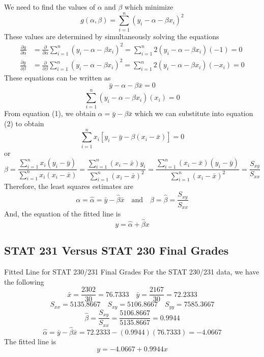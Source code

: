 We need to find the values of $ \alpha $ and $ \beta $ which minimize
\[g(\alpha, \beta)=\sum_{i=1}^{n}\left(y_{i}-\alpha-\beta x_{i}\right)^{2}\]
These values are determined by simultaneously solving the equations
\[
    \begin{aligned}
        \frac{\partial g}{\partial \alpha} & =\frac{\partial}{\partial \alpha} \sum_{i=1}^{n}\left(y_{i}-\alpha-\beta x_{i}\right)^{2}=\sum_{i=1}^{n} 2\left(y_{i}-\alpha-\beta x_{i}\right)(-1)=0               \\
        \frac{\partial g}{\partial \beta}  & =\frac{\partial}{\partial \beta} \sum_{i=1}^{n}\left(y_{i}-\alpha-\beta x_{i}\right)^{2}=\sum_{i=1}^{n} 2\left(y_{i}-\alpha-\beta x_{i}\right)\left(-x_{i}\right)=0
    \end{aligned}
\]
These equations can be written as
\begin{equation}\tag{1}
    \bar{y}-\alpha-\beta \bar{x}=0
\end{equation}
\begin{equation}\tag{2}
    \sum_{i=1}^{n}\left(y_{i}-\alpha-\beta x_{i}\right)\left(x_{i}\right)=0
\end{equation}
From equation (1), we obtain $ \alpha=\bar{y}-\beta \bar{x} $ which
we can substitute into equation (2) to obtain
\[\sum_{i=1}^{n} x_{i}\left[y_{i}-\bar{y}-\beta\left(x_{i}-\bar{x}\right)\right]=0\]
or
\[\beta=
    \frac{\sum\limits_{i=1}^{n} x_{i}\left(y_{i}-\bar{y}\right)}
    {\sum\limits_{i=1}^{n} x_{i}\left(x_{i}-\bar{x}\right)}
    =\frac{\sum\limits_{i=1}^{n}\left(x_{i}-\bar{x}\right) y_{i}}
    {\sum\limits_{i=1}^{n}\left(x_{i}-\bar{x}\right)^{2}}
    =\frac{\sum\limits_{i=1}^{n}\left(x_{i}-\bar{x}\right)\left(y_{i}-\bar{y}\right)}
    {\sum\limits_{i=1}^{n}\left(x_{i}-\bar{x}\right)^{2}}
    =\frac{S_{x y}}{S_{x x}}\]
Therefore, the least squares estimates are
\[\alpha=\hat{\alpha}=\bar{y}-\hat{\beta} \bar{x}
    \quad \text{and} \quad \beta=\hat{\beta}=\frac{S_{x y}}{S_{x x}}\]
And, the equation of the fitted line is
\[y=\hat{\alpha}+\hat{\beta} x\]

\subsection{STAT 231 Versus STAT 230 Final Grades}


\begin{Example}{Fitted Line for STAT 230/231 Final Grades}{}
    For the STAT 230/231 data, we have the following
    \[\bar{x}=\frac{2302}{30}=76.7333 \quad \bar{y}=\frac{2167}{30}=72.2333\]
    \[S_{x x}=5135.8667 \quad S_{x y}=5106.8667 \quad S_{y y}=7585.3667\]
    \[\hat{\beta}=\frac{S_{x y}}{S_{x x}}=\frac{5106.8667}{5135.8667}=0.9944\]
    \[\hat{\alpha}=\bar{y}-\hat{\beta} \bar{x}=72.2333-(0.9944)(76.7333)=-4.0667\]
    The fitted line is
    \[y=-4.0667+0.9944 x\]
\end{Example}


